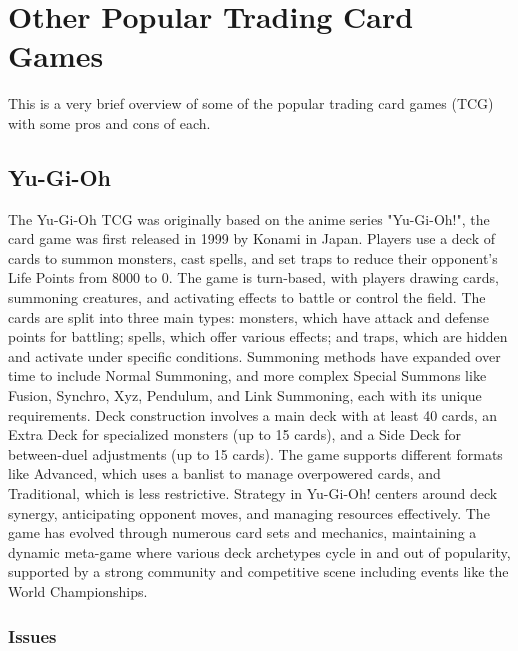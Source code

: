 \section{Other Popular Trading Card Games}

This is a very brief overview of some of the popular trading card games (TCG) with some pros and cons of each.







\subsection{Yu-Gi-Oh}

The Yu-Gi-Oh TCG was originally based on the anime series "Yu-Gi-Oh!", the card game was first released in 1999 by Konami in Japan. Players use a deck of cards to summon monsters, cast spells, and set traps to reduce their opponent's Life Points from 8000 to 0. The game is turn-based, with players drawing cards, summoning creatures, and activating effects to battle or control the field. The cards are split into three main types: monsters, which have attack and defense points for battling; spells, which offer various effects; and traps, which are hidden and activate under specific conditions. Summoning methods have expanded over time to include Normal Summoning, and more complex Special Summons like Fusion, Synchro, Xyz, Pendulum, and Link Summoning, each with its unique requirements. Deck construction involves a main deck with at least 40 cards, an Extra Deck for specialized monsters (up to 15 cards), and a Side Deck for between-duel adjustments (up to 15 cards). The game supports different formats like Advanced, which uses a banlist to manage overpowered cards, and Traditional, which is less restrictive. Strategy in Yu-Gi-Oh! centers around deck synergy, anticipating opponent moves, and managing resources effectively. The game has evolved through numerous card sets and mechanics, maintaining a dynamic meta-game where various deck archetypes cycle in and out of popularity, supported by a strong community and competitive scene including events like the World Championships.

\subsubsection{Issues}

